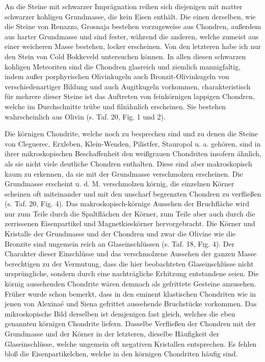 \documentclass[a4paper, 12pt, oneside]{article}
\begin{document}
An die Steine mit schwarzer Imprägnation reihen sich diejenigen mit matter schwarzer kohligen Grundmasse, die kein Eisen enthält. Die einen derselben, wie die Steine von Renazzo, Grosnaja bestehen vorzugsweise aus Chondren, außerdem aus harter Grundmasse und sind fester, während die anderen, welche zumeist aus einer weicheren Masse bestehen, locker erscheinen. Von den letzteren habe ich nur den Stein von Cold Bokkeveld untersuchen können. In allen diesen schwarzen kohligen Meteoriten sind die Chondren glasreich und ziemlich mannigfaltig, indem außer porphyrischen Olivinkugeln auch Bronzit-Olivinkugeln von verschiedenartiger Bildung und auch Augitkugeln vorkommen, charakteristisch für mehrere dieser Steine ist das Auftreten von feinkörnigen lappigen Chondren, welche im Durchschnitte trübe und filzähnlich erscheinen. Sie bestehen wahrscheinlich aus Olivin (s. Taf. 20, Fig. 1 und 2).

Die körnigen Chondrite, welche noch zu besprechen sind und zu denen die Steine von Cleguerec, Erxleben, Klein-Wenden, Pilistfer, Stauropol u. a. gehören, sind in ihrer mikroskopischen Beschaffenheit den weißgrauen Chondriten insofern ähnlich, als sie nicht viele deutliche Chondren enthalten. Diese sind aber makroskopisch kaum zu erkennen, da sie mit der Grundmasse verschmolzen erscheinen. Die Grundmasse erscheint u. d. M. verschmolzen körnig, die einzelnen Körner scheinen oft miteinander und mit den unscharf begrenzten Chondren zu verfließen (s. Taf. 20, Fig. 4). Das makroskopisch-körnige Aussehen der Bruchfläche wird nur zum Teile durch die Spaltflächen der Körner, zum Teile aber auch durch die zerrissenen Eisenpartikel und Magnetkieskörner hervorgebracht. Die Körner und Kristalle der Grundmasse und der Chondren und zwar die Olivine wie die Bronzite sind ungemein reich an Glaseinschlüssen (s. Taf. 18, Fig. 4). Der Charakter dieser Einschlüsse und das verschmolzene Aussehen der ganzen Masse berechtigen zu der Vermutung, dass die hier beobachteten Glaseinschlüsse nicht ursprüngliche, sondern durch eine nachträgliche Erhitzung entstandene seien. Die körnig aussehenden Chondrite wären demnach als gefrittete Gesteine anzusehen. Früher wurde schon bemerkt, dass in den eminent klastischen Chondriten wie in jenen von Alexinaé und Siena gefrittet aussehende Bruchstücke vorkommen. Das mikroskopische Bild derselben ist demjenigen fast gleich, welches die eben genannten körnigen Chondrite liefern. Dasselbe Verfließen der Chondren mit der Grundmasse und der Körner in der letzteren, dieselbe Häufigkeit der Glaseinschlüsse, welche ungemein oft negativen Kristallen entsprechen. Es fehlen bloß die Eisenpartikelchen, welche in den körnigen Chondriten häufig sind.
\end{document}
